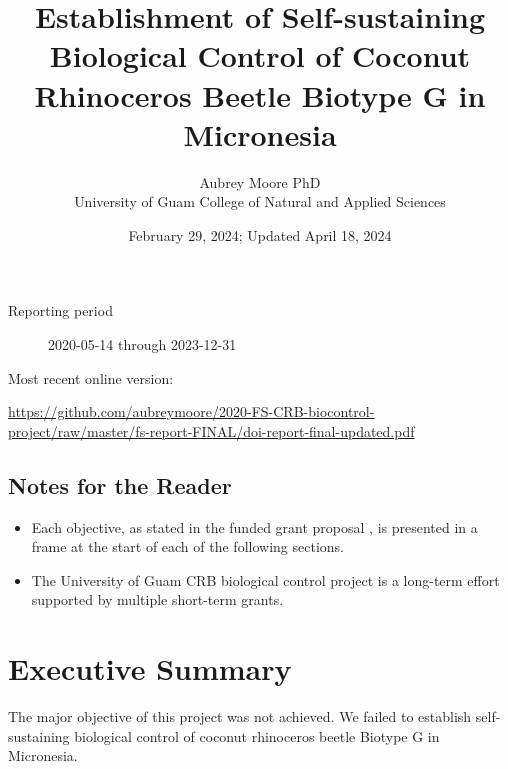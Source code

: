 \documentclass[12pt,letterpaper,english,bibliography=totocnumbered, abstract=on]{scrartcl}
\begin{document}
\titlehead{Final Report: DOI-OIA-D20AP00060}

\title{Establishment of Self-sustaining Biological Control of Coconut Rhinoceros Beetle Biotype G in Micronesia}

\author{Aubrey Moore PhD\\University of Guam College of Natural and Applied Sciences}

\date{February 29, 2024; Updated April 18, 2024}

\maketitle

\begin{description}
	\item[Reporting period] 2020-05-14 through 2023-12-31
\end{description}

Most recent online version: \\
\begin{footnotesize}	
	\url{https://github.com/aubreymoore/2020-FS-CRB-biocontrol-project/raw/master/fs-report-FINAL/doi-report-final-updated.pdf}
\end{footnotesize}

\clearpage

\tableofcontents

\clearpage


\newpage

\subsection*{Notes for the Reader}

\begin{itemize}

\item Each objective, as stated in the funded grant proposal \cite{mooreGrantProposalDOIOIA2020}, is presented in a frame at the start of each of the following sections. 

\item The University of Guam CRB biological control project is a long-term effort supported by multiple short-term grants.  

\end{itemize}

\clearpage

\section{Executive Summary}
The major objective of this project was not achieved. We failed to establish self-sustaining biological control of coconut rhinoceros beetle Biotype G in Micronesia.
\clearpage
\end{document}
